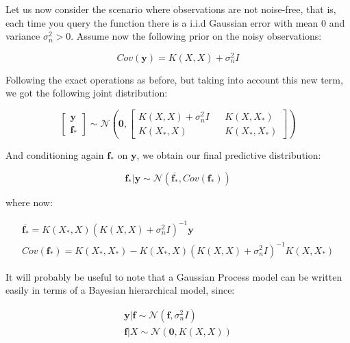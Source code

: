 \documentclass[10pt,a4paper,twoside]{book}
\begin{document}
Let us now consider the scenario where observations are not noise-free, that is, each time you query the function there is a i.i.d Gaussian error with mean $0$ and variance $\sigma_n^2 > 0$. Assume now the following prior on the noisy observations:

\begin{equation}
Cov(\boldsymbol{y}) = K(X, X) + \sigma^2_n I 
\end{equation}

Following the exact operations as before, but taking into account this new term, we got the following joint distribution:

\begin{equation}
\begin{bmatrix}
\boldsymbol{y}\\
\boldsymbol{f_*}
\end{bmatrix} \sim \mathcal{N}\left(
\boldsymbol{0},
\begin{bmatrix}
K(X, X) + \sigma^2_n I && K(X, X_*) \\
K(X_*, X) && K(X_*, X_*)
\end{bmatrix}
\right)
\end{equation}

And conditioning again $\boldsymbol{f_{*}}$ on $\boldsymbol{y}$, we obtain our final predictive distribution:

\begin{equation}
\boldsymbol{f_*|y} \sim \mathcal{N}(\boldsymbol{\overline{f_*}},  Cov(\boldsymbol{f_*}))
\end{equation}

where now:

\begin{align}
\boldsymbol{\overline{f_*}} = K(X_*, X)\left(K(X, X) + \sigma^2_n I   \right)^{-1}\boldsymbol{y}\\
Cov(\boldsymbol{f_*}) = K(X_*, X_*) - K(X_*, X)\left(K(X, X) + \sigma_n^2 I \right)^{-1}K(X, X_*)
\end{align}

It will probably be useful to note that a Gaussian Process model can be written easily in terms of a Bayesian hierarchical model, since:

\begin{align}
\label{hierarchical}
\boldsymbol{y}|\boldsymbol{f} \sim \mathcal{N}(\boldsymbol{f}, \sigma^2_n I)\\
\label{hierarchical2}
\boldsymbol{f}|X \sim \mathcal{N}(\boldsymbol{0}, K(X, X))
\end{align}
\end{document}
